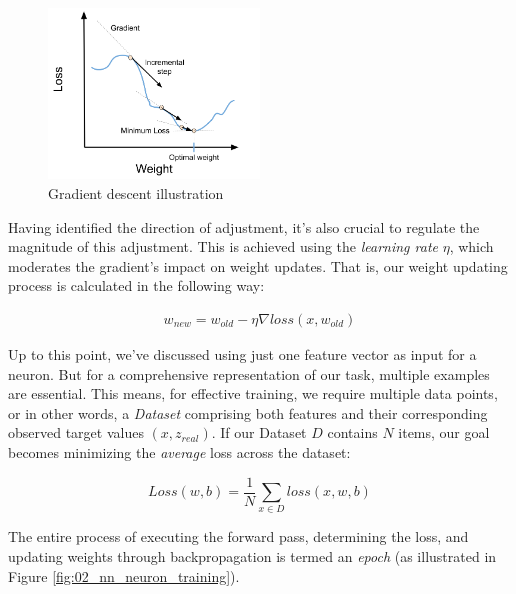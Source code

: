 \begin{figure}
\centering
\includegraphics[width=0.5\textwidth]{Figures/02/02_gradient_descent.png}
\caption{Gradient descent illustration}
\label{fig:02_nn_gradient_descent}
\end{figure}

Having identified the direction of adjustment, it's also crucial to regulate the magnitude of this adjustment. This is achieved using the \emph{learning rate} $\eta$, which moderates the gradient's impact on weight updates. That is, our weight updating process is calculated in the following way:

\begin{align}
w_{new} = w_{old} - \eta \nabla loss(x, w_{old}) \label{eq:02_nn_gradient_descent}
\end{align}




\label{02_nn_training}



Up to this point, we've discussed using just one feature vector as input for a neuron. But for a comprehensive representation of our task, multiple examples are essential. This means, for effective training, we require multiple data points, or in other words, a \emph{Dataset} comprising both features and their corresponding observed target values $(x,z_{real})$. If our Dataset $D$ contains $N$ items, our goal becomes minimizing the \emph{average} loss across the dataset:

\begin{equation}
Loss(w,b) = \dfrac{1}{N} \sum_{x\in D} loss(x,w,b)
\end{equation}

The entire process of executing the forward pass, determining the loss, and updating weights through backpropagation is termed an \emph{epoch} (as illustrated in Figure \ref{fig:02_nn_neuron_training}).

